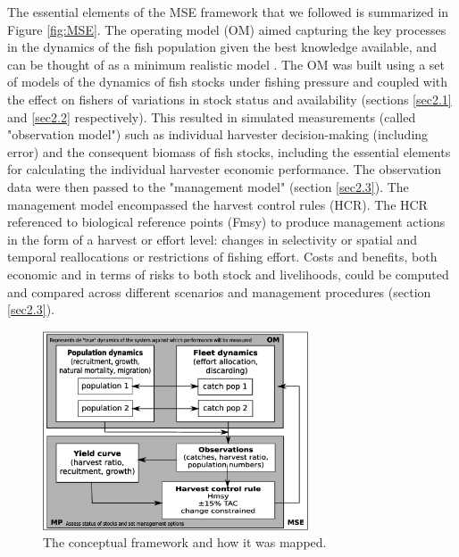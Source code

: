 \documentclass[12pt,oneline,a4paper,numbib]{ouparticle}
\numberwithin{equation}{subsection} %
\begin{document}
The essential elements of the MSE framework that we followed is summarized in Figure \ref{fig:MSE}. The operating model (OM) aimed capturing the key processes in the dynamics of the fish population given the best knowledge available, and can be thought of as a minimum realistic model \cite{Punt1995}. The OM was built using a set of models of the dynamics of fish stocks under fishing pressure and coupled with the effect on fishers of variations in stock status and availability (sections \ref{sec2.1} and \ref{sec2.2} respectively). This resulted in simulated measurements (called "observation model") such as individual harvester decision-making (including error) and the consequent biomass of fish stocks, including the essential elements for calculating the individual harvester economic performance. The observation data were then passed to the "management model" (section \ref{sec2.3}). The management model encompassed the harvest control rules (HCR). The HCR referenced to biological reference points (Fmsy) to produce management actions in the form of a harvest or effort level: changes in selectivity or spatial and temporal reallocations or restrictions of fishing effort. Costs and benefits, both economic and in terms of risks to both stock and livelihoods, could be computed and compared across different scenarios and management procedures (section \ref{sec2.3}).

 
\begin{figure}[!h]
\centering
\includegraphics[width=0.7\textwidth]{Figures/MSE.eps} 
\caption{The conceptual framework and how it was mapped.}
\end{figure}
\end{document}
